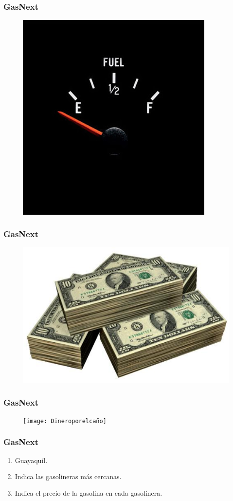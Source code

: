 \documentclass{beamer}
\begin{document}
\begin{frame}[allowframbreaks]
\frametitle{GasNext}
\begin{figure}[h]
\centering
\includegraphics[height=0.5\textheight]{Sinnadadegasolina}
\end{figure}
\end{frame}

\begin{frame}[allowframbreaks]
\frametitle{GasNext}
\begin{figure}[h]
\centering
\includegraphics[height=0.5\textheight]{Dinerofull}
\end{figure}
\end{frame}

\begin{frame}[allowframbreaks]
\frametitle{GasNext}
\begin{figure}[h]
\centering
\texttt{[image: Dineroporelcaño]}
\end{figure}
\end{frame}

\begin{frame}[allowframbreaks]
\frametitle{GasNext}
\begin{enumerate}
\item Guayaquil.
\item Indica las gasolineras m\'as cercanas.
\item Indica el precio de la gasolina en cada gasolinera.
\end{enumerate}
\end{frame}
\end{document}
